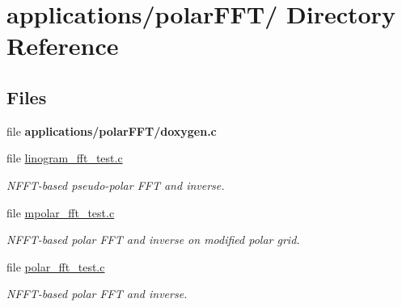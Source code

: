 \hypertarget{dir_000013}{
\section{applications/polar\-FFT/ Directory Reference}
\label{dir_000013}
}
\subsection*{Files}
\begin{CompactItemize}
\item 
file {\bf applications/polar\-FFT/doxygen.c}
\item 
file \hyperlink{linogram__fft__test_8c}{linogram\_\-fft\_\-test.c}
\begin{CompactList}\small\item\em NFFT-based pseudo-polar FFT and inverse. \item\end{CompactList}

\item 
file \hyperlink{mpolar__fft__test_8c}{mpolar\_\-fft\_\-test.c}
\begin{CompactList}\small\item\em NFFT-based polar FFT and inverse on modified polar grid. \item\end{CompactList}

\item 
file \hyperlink{polar__fft__test_8c}{polar\_\-fft\_\-test.c}
\begin{CompactList}\small\item\em NFFT-based polar FFT and inverse. \item\end{CompactList}

\end{CompactItemize}
